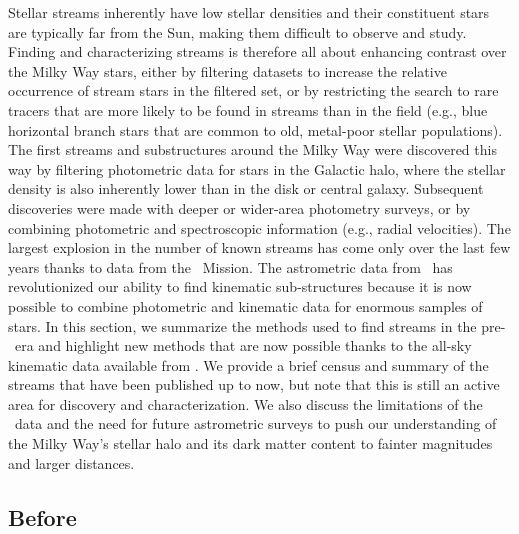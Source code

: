 \documentclass[final,5p,times,twocolumn,authoryear]{elsarticle}
\begin{document}
Stellar streams inherently have low stellar densities and their constituent stars are
typically far from the Sun, making them difficult to observe and study.
Finding and characterizing streams is therefore all about enhancing contrast over the
 Milky Way stars, either by filtering datasets to increase the relative
occurrence of stream stars in the filtered set, or by restricting the search to rare
tracers that are more likely to be found in streams than in the field (e.g., blue
horizontal branch stars that are common to old, metal-poor stellar populations).
The first streams and substructures around the Milky Way were discovered this way by
filtering photometric data for stars in the Galactic halo, where the  stellar
density is also inherently lower than in the disk or central galaxy.
Subsequent discoveries were made with deeper or wider-area photometry surveys, or by
combining photometric and spectroscopic information (e.g., radial velocities).
The largest explosion in the number of known streams has come only over the last few
years thanks to data from the \gaia\ Mission.
The astrometric data from \gaia\ has revolutionized our ability to find kinematic
sub-structures because it is now possible to combine photometric and kinematic data for
enormous samples of stars.
In this section, we summarize the methods used to find streams in the pre-\gaia\ era and
highlight new methods that are now possible thanks to the all-sky kinematic data
available from \gaia.
We provide a brief census and summary of the streams that have been published up to now,
but note that this is still an active area for discovery and characterization.
We also discuss the limitations of the \gaia\ data and the need for future astrometric
surveys to push our understanding of the Milky Way's stellar halo and its dark matter
content to fainter magnitudes and larger distances.


\subsection{Before \gaia}
\end{document}
